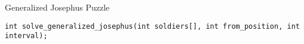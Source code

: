\begin{frame}[fragile]{Generalized Josephus Puzzle}
  \begin{lstlisting}[style = Cstyle]
    int solve_generalized_josephus(int soldiers[], int from_position, int interval);
  \end{lstlisting}
\end{frame}

